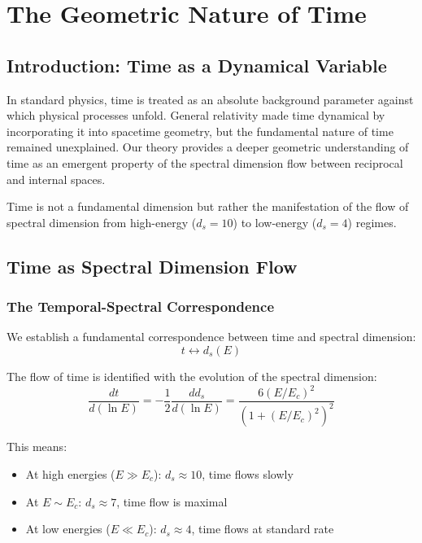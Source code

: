 \chapter{The Geometric Nature of Time}
\label{chap:time}

\section{Introduction: Time as a Dynamical Variable}

In standard physics, time is treated as an absolute background parameter against which physical processes unfold. General relativity made time dynamical by incorporating it into spacetime geometry, but the fundamental nature of time remained unexplained. Our theory provides a deeper geometric understanding of time as an emergent property of the spectral dimension flow between reciprocal and internal spaces.

\begin{keyinsight}
Time is not a fundamental dimension but rather the manifestation of the flow of spectral dimension from high-energy ($d_s = 10$) to low-energy ($d_s = 4$) regimes.
\end{keyinsight}

\section{Time as Spectral Dimension Flow}

\subsection{The Temporal-Spectral Correspondence}

We establish a fundamental correspondence between time and spectral dimension:
\begin{equation}
    t \longleftrightarrow d_s(E)
\end{equation}

The flow of time is identified with the evolution of the spectral dimension:
\begin{equation}
    \frac{dt}{d(\ln E)} = -\frac{1}{2}\frac{dd_s}{d(\ln E)} = \frac{6(E/E_c)^2}{(1 + (E/E_c)^2)^2}
\end{equation}

This means:
\begin{itemize}
    \item At high energies ($E \gg E_c$): $d_s \approx 10$, time flows slowly
    \item At $E \sim E_c$: $d_s \approx 7$, time flow is maximal
    \item At low energies ($E \ll E_c$): $d_s \approx 4$, time flows at standard rate
\end{itemize}

